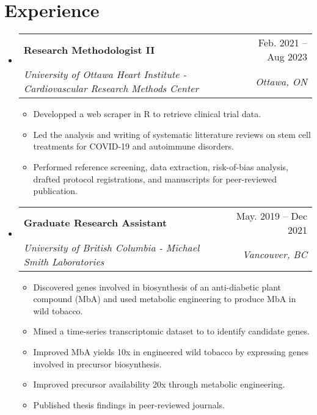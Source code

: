\documentclass[letterpaper,11pt]{article}
\makeatletter
\newcommand{\resumeItem}[1]{
  \item\small{
    {#1 \vspace{-2pt}}
  }
}
\newcommand{\resumeSubheading}[4]{
  \vspace{-2pt}\item
    \begin{tabular*}{0.97\textwidth}[t]{l@{\extracolsep{\fill}}r}
      \textbf{#1} & #2 \\
      \textit{\small#3} & \textit{\small #4} \\
    \end{tabular*}\vspace{-7pt}
}
\newcommand{\resumeSubSubheading}[2]{
    \item
    \begin{tabular*}{0.97\textwidth}{l@{\extracolsep{\fill}}r}
      \textit{\small#1} & \textit{\small #2} \\
    \end{tabular*}\vspace{-7pt}
}
\newcommand{\resumeSubHeadingListStart}{\begin{itemize}[leftmargin=0.15in, label={}]}
\newcommand{\resumeSubHeadingListEnd}{\end{itemize}}
\newcommand{\resumeItemListStart}{\begin{itemize}}
\newcommand{\resumeItemListEnd}{\end{itemize}\vspace{-5pt}}
\makeatother
\begin{document}

\section{Experience}
  \resumeSubHeadingListStart
  
    \resumeSubheading
      {Research Methodologist II}{Feb. 2021 -- Aug 2023}
      {University of Ottawa Heart Institute - Cardiovascular Research Methods Center}{Ottawa, ON}
      \resumeItemListStart
        \resumeItem{Developped a web scraper in R to retrieve clinical trial data.}
        \resumeItem{Led the analysis and writing of systematic litterature reviews on stem cell treatments for COVID-19 and autoimmune disorders.}
        \resumeItem{Performed reference screening, data extraction, risk-of-bias analysis, drafted protocol registrations, and manuscripts for peer-reviewed publication.}
    \resumeItemListEnd
    
    \resumeSubheading
      {Graduate Research Assistant}{May. 2019 -- Dec 2021}
      {University of British Columbia - Michael Smith Laboratories }{Vancouver, BC}
      \resumeItemListStart
        \resumeItem{Discovered genes involved in biosynthesis of an anti-diabetic plant compound (MbA) and used metabolic engineering to produce MbA in wild tobacco.}
        \resumeItem{Mined a time-series transcriptomic dataset to to identify candidate genes.}
        \resumeItem{Improved MbA yields 10x in engineered wild tobacco by expressing genes involved in precursor biosynthesis.}
        \resumeItem{Improved precursor availability 20x through metabolic engineering.}
        \resumeItem{Published thesis findings in peer-reviewed journals.}
      \resumeItemListEnd
      



  \resumeSubHeadingListEnd

  
\end{document}
